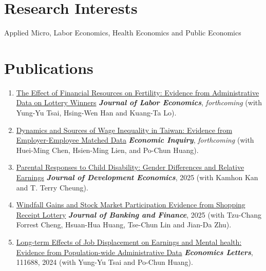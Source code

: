 \documentclass[10pt,letterpaper]{article}
\renewenvironment{itemize}{
  \begin{list}{}{
      \setlength{\leftmargin}{1.5em}
      \setlength{\itemsep}{0.25em}
      \setlength{\parskip}{0pt}
      \setlength{\parsep}{0.25em}
    }
}{
  \end{list}
}
\begin{document}
\section*{\textbf{Research Interests}}

Applied Micro, Labor Economics, Health Economics and Public Economics

\section*{\textbf{Publications}}

\begin{enumerate}




\item
\href{https://papers.ssrn.com/sol3/papers.cfm?abstract_id=4300448}{The Effect of Financial Resources on Fertility: Evidence from Administrative Data on Lottery Winners} \textit{\textbf{Journal of Labor Economics}}, \textit{forthcoming} (with Yung-Yu Tsai, Hsing-Wen Han and Kuang-Ta Lo).

\item
\href{https://www.dropbox.com/scl/fi/xigzri0wajwxznqpplb4c/Dynamics-and-Sources-of-Wage-Inequality-in-Taiwan-Evidence-from-Employer-Employee-Matched-Data.pdf?rlkey=6jwpdl3vgwgk82z9q75s9cgg3&dl=0}{Dynamics and Sources of Wage Inequality in Taiwan: Evidence from Employer-Employee Matched Data} \textit{\textbf{Economic Inquiry}}, \textit{forthcoming} (with Huei-Ming Chen, Hsien-Ming Lien, and Po-Chun Huang).

\item
\href{https://www.sciencedirect.com/science/article/abs/pii/S0304387825000112}{Parental Responses to Child Disability: Gender Differences and Relative Earnings} \textit{\textbf{Journal of Development Economics}}, 2025 (with Kamhon Kan and T. Terry Cheung).

\item
\href{https://www.sciencedirect.com/science/article/abs/pii/S0378426624002929}{Windfall Gains and Stock Market Participation Evidence from Shopping Receipt Lottery} \textit{\textbf{Journal of Banking and Finance}}, 2025 (with Tzu-Chang Forrest Cheng, Hsuan-Hua Huang, Tse-Chun Lin and Jian-Da Zhu).


\item
\href{https://www.dropbox.com/scl/fi/l9acw3h4gj8yzrdfav2w5/Job-Loss_Health_Full_v2.pdf?rlkey=bkgdf6v72teahl6jj4iq7b440&dl=0}{Long-term Effects of Job Displacement on Earnings and Mental health: Evidence from Population-wide Administrative Data} \textit{\textbf{Economics Letters}}, 111688, 2024 (with Yung-Yu Tsai and Po-Chun Huang).


\end{enumerate}
\end{document}
